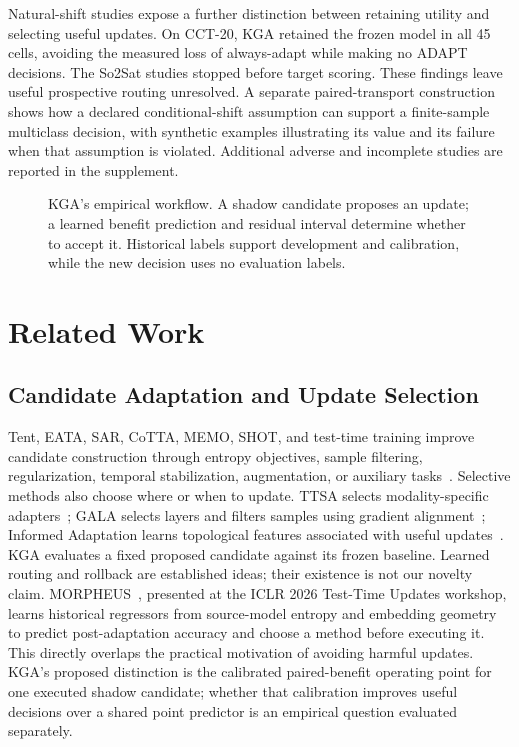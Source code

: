 Natural-shift studies expose a further distinction between retaining utility and selecting
useful updates. On CCT-20, KGA retained the frozen model in all 45 cells, avoiding the measured
loss of always-adapt while making no ADAPT decisions. The So2Sat studies stopped before target
scoring. These findings leave useful prospective routing unresolved. A separate paired-transport
construction shows how a declared conditional-shift assumption can support a finite-sample
multiclass decision, with synthetic examples illustrating its value and its failure when that
assumption is violated. Additional adverse and incomplete studies are reported in the supplement.

\begin{figure}[t]
  \centering
  \caption{KGA's empirical workflow. A shadow candidate proposes an update; a learned benefit
  prediction and residual interval determine whether to accept it. Historical labels support
  development and calibration, while the new decision uses no evaluation labels.}
  \label{fig:compact-flow}
\end{figure}

\section{Related Work}
\label{sec:compact-related}

\subsection{Candidate Adaptation and Update Selection}

Tent, EATA, SAR, CoTTA, MEMO, SHOT, and test-time training improve candidate construction through
entropy objectives, sample filtering, regularization, temporal stabilization, augmentation, or
auxiliary tasks~\cite{wang2021tent,niu2022eata,niu2023sar,wang2022cotta,zhang2022memo,
liang2020shot,sun2020ttt}. Selective methods also choose where or when to update. TTSA selects
modality-specific adapters~\cite{chen2025ttsa}; GALA selects layers and filters samples using
gradient alignment~\cite{sahoo2025gala}; Informed Adaptation learns topological features associated
with useful updates~\cite{mutlu2026informed}. KGA evaluates a fixed proposed candidate against its
frozen baseline. Learned routing and rollback are established ideas; their existence is not our
novelty claim.
MORPHEUS~\cite{danilowski2026morpheus}, presented at the ICLR 2026 Test-Time Updates
workshop, learns historical regressors from source-model entropy and embedding
geometry to predict post-adaptation accuracy and choose a method before executing
it. This directly overlaps the practical motivation of avoiding harmful updates.
KGA's proposed distinction is the calibrated paired-benefit operating point for
one executed shadow candidate; whether that calibration improves useful decisions
over a shared point predictor is an empirical question evaluated separately.

